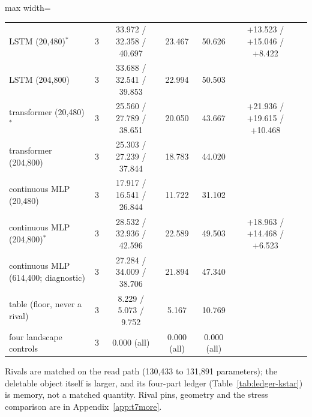 \documentclass{article} %
\begin{document}
\begin{table}[t]
\begin{adjustbox}{max width=\linewidth}
\begin{tabular}{lcccccc}
LSTM (20,480)$^\ast$ & 3 & 33.972 / 32.358 / 40.697 & 23.467 & 50.626 & +13.523 / +15.046 / +8.422 & \\
LSTM (204,800) & 3 & 33.688 / 32.541 / 39.853 & 22.994 & 50.503 & & \\
transformer (20,480)$^\ast$ & 3 & 25.560 / 27.789 / 38.651 & 20.050 & 43.667 & +21.936 / +19.615 / +10.468 & \\
transformer (204,800) & 3 & 25.303 / 27.239 / 37.844 & 18.783 & 44.020 & & \\
continuous MLP (20,480) & 3 & 17.917 / 16.541 / 26.844 & 11.722 & 31.102 & & \\
continuous MLP (204,800)$^\ast$ & 3 & 28.532 / 32.936 / 42.596 & 22.589 & 49.503 & +18.963 / +14.468 / +6.523 & \\
continuous MLP (614,400; diagnostic) & 3 & 27.284 / 34.009 / 38.706 & 21.894 & 47.340 & & \\
table (floor, never a rival) & 3 & 8.229 / 5.073 / 9.752 & 5.167 & 10.769 & & \\
\midrule
four landscape controls & 3 & 0.000 (all) & 0.000 (all) & 0.000 (all) & & \\
\bottomrule
\end{tabular}\end{adjustbox}
\end{table}


\noindent Rivals are matched on the read path (130,433 to 131,891 parameters); the deletable object
itself is larger, and its four-part ledger (Table~\ref{tab:ledger-kstar}) is memory, not a matched
quantity. Rival pins, geometry and the stress comparison are in Appendix~\ref{app:t7more}.
\end{document}
